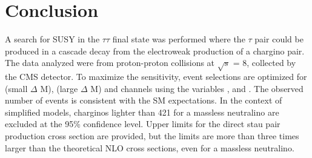 \section{Conclusion}
\label{sect:conclusion}
A search for SUSY in the $\tau\tau$ final state was performed where the
$\tau$ pair could be produced in a cascade decay from the electroweak production of a chargino pair.  The data analyzed were from proton-proton collisions
at $\sqrt{s}$ = 8\TeV, collected by the CMS detector.
To maximize the sensitivity, event selections are optimized for \tauTau (small $\Delta$ M), 
\tauTau (large $\Delta$ M) and \leptonTau channels using the variables \mttwo, \tauMT and \SumMT.
The observed number of events is consistent with the SM expectations. 
In the context of simplified models, charginos lighter than 421\GeV 
for a massless neutralino  are excluded at the 95\% confidence level.
Upper limits for the direct stau pair production cross section are provided, but the limits are more than three times
larger than the theoretical NLO cross sections, 
even for a massless neutralino.


